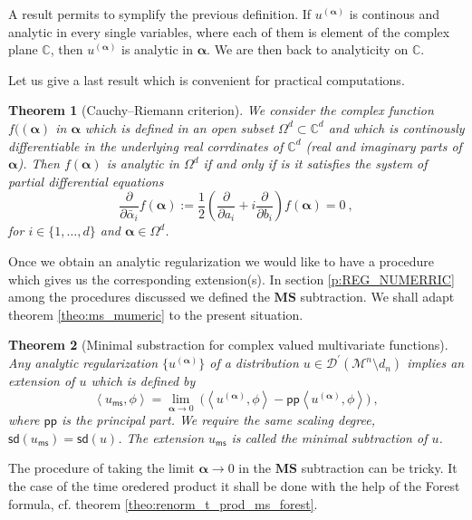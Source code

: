 \documentclass[11pt]{book}
\newcommand{\pp}{\mathsf{pp}}
\newcommand{\ms}{\mathsf{ms}}
\newcommand{\sd}{\mathsf{sd}}
\newcommand{\MS}{\textbf{MS}}
\newcommand{\alphabd}{\boldsymbol{\alpha}}
\newcommand{\sm}[1]{\left\langle#1\right\rangle}
\newcommand{\Dcal}{\mathcal{D}}
\newcommand{\Mcal}{\mathcal{M}}
\newcommand{\Cbb}{\mathbb{C}}
\theoremstyle{break}
\newtheorem{theorem}{Theorem}[chapter]
\begin{document}
A result permits to symplify the previous definition. If $u^{(\alphabd)}$ is continous and analytic in every single variables, where each of them is element of the complex plane $\Cbb$, then $u^{(\alphabd)}$ is analytic in $\alphabd$. We are then back to analyticity on $\Cbb$.


Let us give a last result which is convenient for practical computations. 


\begin{theorem}[Cauchy--Riemann criterion]
We consider the complex function $f((\alphabd)$ in $\alphabd$ which is defined in an open subset $\Omega^d \subset \Cbb^d$ and which is continously differentiable in the underlying real corrdinates of $\Cbb^d$ (real and imaginary parts of $\alphabd$). Then $f(\alphabd)$ is analytic in $\Omega^d$ if and only if is it satisfies the system of partial differential equations
%
\begin{equation}
\frac{\partial}{\partial \bar{\alpha}_i} f(\alphabd) := \frac12 \left( \frac{\partial}{\partial a_i} + i \frac{\partial}{\partial b_i} \right) f(\alphabd) = 0 \ ,
\end{equation}
%
for $i\in\{1,\dots,d\}$ and $\alphabd\in\Omega^d$.
\end{theorem}



Once we obtain an analytic regularization we would like to have a procedure which gives us the corresponding extension(s). In section \ref{p:REG_NUMERRIC} among the procedures discussed we defined the $\MS$ subtraction. We shall adapt theorem \ref{theo:ms_mumeric} to the present situation.


\begin{theorem}[Minimal substraction for complex valued multivariate functions]\label{theo:ms_general}
Any analytic regularization $\{u^{(\alphabd)}\}$ of a distribution $u \in \Dcal^\prime(\Mcal^n\setminus d_n)$ implies an extension of $u$ which is defined by 
%
\begin{equation*}
\sm{u_\ms,\phi} = \lim_{\alphabd \to 0} \ \bigg( \sm{u^{(\alphabd)},\phi} - \pp\sm{u^{(\alphabd)},\phi}\bigg) \ ,
\end{equation*}
%
where $\pp$ is the principal part. We require the same scaling degree, $\sd(u_\ms) = \sd(u)$. The extension $u_\ms$ is called the minimal subtraction of $u$.
\end{theorem}


The procedure of taking the limit $\alphabd \to 0$ in the $\MS$ subtraction can be tricky. It the case of the time oredered product it shall be done with the help of the Forest formula, cf. theorem \ref{theo:renorm_t_prod_ms_forest}.
\end{document}
